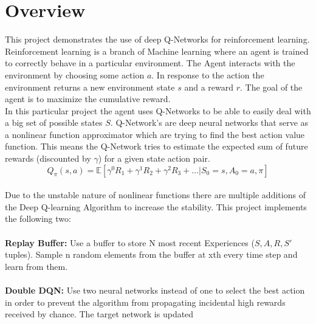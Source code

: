 \documentclass[12pt,a4paper]{article}
\begin{document}
    \section{Overview}\label{sec:overview}
    This project demonstrates the use of deep Q-Networks for reinforcement learning.
    Reinforcement learning is a branch of Machine learning where an agent is trained to correctly behave in
    a particular environment.
    The Agent interacts with the environment by choosing some action $a$.
    In response to the action the environment returns a new environment state $s$ and a reward $r$.
    The goal of the agent is to maximize the cumulative reward.
    \\
    In this particular project the agent uses Q-Networks to be able to easily deal with a big set of possible states $S$.
    Q-Network's are deep neural networks that serve as a nonlinear function approximator which are trying to find the best action value function.
    This means the Q-Network tries to estimate the expected sum of future rewards (discounted by $\gamma$) for a given state action pair.
    $$Q_{\pi}(s,a)=\mathbb{E}[\gamma ^{0}R_{1}+\gamma ^{1}R_{2}+\gamma ^{2}R_{3}+...|S_{0}=s, A_{0}=a, \pi]$$
    \\
    Due to the unstable nature of nonlinear functions there are multiple additions of the Deep Q-learning Algorithm to increase the stability.
    This project implements the following two:
    \\\\
    \textbf{Replay Buffer:}
    Use a buffer to store N most recent Experiences ($S, A, R, S'$ tuples).
    Sample n random elements from the buffer at xth every time step and learn from them.
    \\\\
    \textbf{Double DQN:}
    Use two neural networks instead of one to select the best action in order to prevent the algorithm from propagating incidental high rewards received by chance.
    The target network is updated
\end{document}
